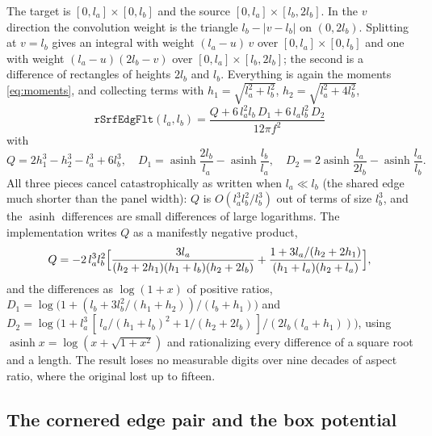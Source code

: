 \documentclass[11pt]{article}
\theoremstyle{remark}
\newcommand{\asinh}{\operatorname{asinh}}
\newcommand{\code}[1]{\texttt{#1}}
\begin{document}
The target is $[0,l_a]\times[0,l_b]$ and the source $[0,l_a]\times[l_b,2l_b]$. In the
$v$ direction the convolution weight is the triangle $l_b - |v - l_b|$ on $(0,2l_b)$.
Splitting at $v = l_b$ gives an integral with weight $(l_a-u)\,v$ over $[0,l_a]\times
[0,l_b]$ and one with weight $(l_a-u)(2l_b - v)$ over $[0,l_a]\times[l_b,2l_b]$; the
second is a difference of rectangles of heights $2l_b$ and $l_b$. Everything is again
the moments \eqref{eq:moments}, and collecting terms with $h_1 = \sqrt{l_a^2+l_b^2}$,
$h_2 = \sqrt{l_a^2+4l_b^2}$,
\begin{equation}
\boxed{\;
\code{rSrfEdgFlt}(l_a,l_b) = \frac{Q + 6\,l_a^2 l_b\,D_1 + 6\,l_a l_b^2\,D_2}{12\pi f^2}\;}
\label{eq:flt}
\end{equation}
with
\begin{equation}
Q = 2h_1^3 - h_2^3 - l_a^3 + 6 l_b^3,\quad
D_1 = \asinh\frac{2l_b}{l_a} - \asinh\frac{l_b}{l_a},\quad
D_2 = 2\asinh\frac{l_a}{2l_b} - \asinh\frac{l_a}{l_b}.
\end{equation}
All three pieces cancel catastrophically as written when $l_a \ll l_b$ (the shared
edge much shorter than the panel width): $Q$ is $O(l_a^3 l_b^2/l_b^3)$ out of terms
of size $l_b^3$, and the $\asinh$ differences are small differences of large
logarithms. The implementation writes $Q$ as a manifestly negative product,
\begin{equation}
Q = -2\,l_a^3 l_b^2\Bigl[\frac{3 l_a}{(h_2+2h_1)(h_1+l_b)(h_2+2l_b)} +
\frac{1 + 3l_a/(h_2+2h_1)}{(h_1+l_a)(h_2+l_a)}\Bigr],
\end{equation}
and the differences as $\log(1+x)$ of positive ratios,
$D_1 = \log\!\bigl(1 + (l_b + 3l_b^2/(h_1+h_2))/(l_b+h_1)\bigr)$ and
$D_2 = \log\!\bigl(1 + l_a^3\,[\,l_a/(h_1+l_b)^2 + 1/(h_2+2l_b)\,]/(2l_b(l_a+h_1))\bigr)$,
using $\asinh x = \log(x + \sqrt{1+x^2})$ and rationalizing every difference of a
square root and a length. The result loses no measurable digits over nine decades of
aspect ratio, where the original lost up to fifteen.

\subsection{The cornered edge pair and the box potential}
\label{sec:crn}
\end{document}
